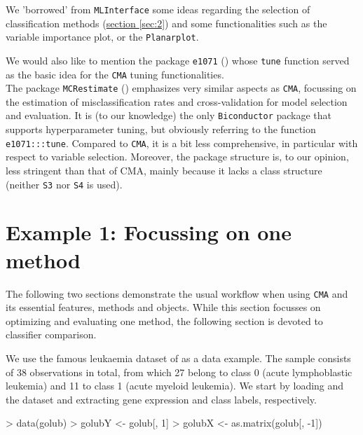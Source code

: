 We 'borrowed' from \texttt{MLInterface} 
some ideas regarding the selection of
classification methods (\hyperref[sec:2]{section }{\ref{sec:2}}) 
and some functionalities such as the variable
importance plot, or the \texttt{Planarplot}. 

We would also like to mention the package \texttt{e1071} (\citet{e1071pack})
whose \texttt{tune} function served as the basic idea for the \texttt{CMA}
tuning functionalities.\\

The package \texttt{MCRestimate} (\citet{MCRestimate}) 
emphasizes very similar aspects as \texttt{CMA}, 
focussing on the estimation of misclassification rates and cross-validation for model 
selection and evaluation. It is (to our knowledge) the only \texttt{Biconductor}
package that supports hyperparameter tuning, but obviously referring to the
function \texttt{e1071:::tune}. Compared to \texttt{CMA}, it is a bit less comprehensive, in particular with respect
to variable selection. Moreover, the package structure is, to our opinion, less
stringent than that of CMA, mainly because it lacks a class structure (neither \texttt{S3}
nor \texttt{S4} is used).  

\section{Example 1: Focussing on one method}\label{sec:ex1}
The following two sections demonstrate the usual workflow when using
\texttt{CMA} and its essential features, methods and objects.
While this section focusses on optimizing and evaluating one method, the
following section is devoted to classifier comparison.

We use the famous leukaemia dataset of \citet{golub1999} as a data example. 
The sample consists of 38 observations in total, from which 27
belong to class 0 (acute lymphoblastic leukemia)  and 11 to class 1 (acute myeloid leukemia).
We start by loading and the dataset and extracting gene expression and class
labels, respectively.
\begin{Schunk}
\begin{Sinput}
> data(golub)
> golubY <- golub[, 1]
> golubX <- as.matrix(golub[, -1])
\end{Sinput}
\end{Schunk}

